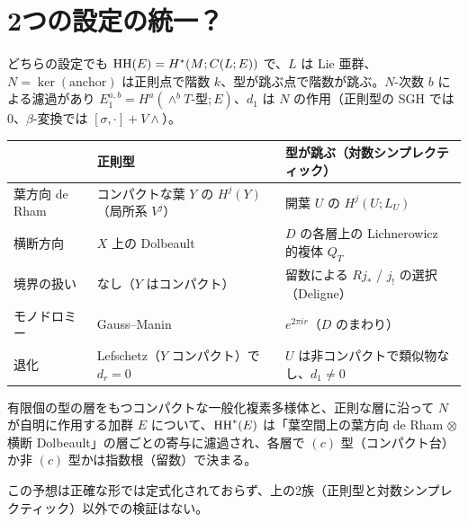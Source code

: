 \section{2つの設定の統一？}\label{sec:unified}
どちらの設定でも $\mathrm{HH}(E)=H^*(M;C(L;E))$ で、$L$ は Lie 亜群、$N=\ker(\text{anchor})$ は正則点で階数 $k$、型が跳ぶ点で階数が跳ぶ。$N$-次数 $b$ による濾過があり $E_1^{a,b}=H^a(\wedge^bT\text{-型};E)$、$d_1$ は $N$ の作用（正則型の SGH では 0、$\beta$-変換では $[\sigma,\cdot]+V\wedge$）。
\begin{center}\small
\begin{tabular}{p{3.2cm}p{5.4cm}p{5.4cm}}\toprule
 & 正則型 & 型が跳ぶ（対数シンプレクティック）\\\midrule
葉方向 de Rham & コンパクトな葉 $Y$ の $H^j(Y)$（局所系 $V^j$） & 開葉 $U$ の $H^j(U;L_U)$ \\\midrule
横断方向 & $X$ 上の Dolbeault & $D$ の各層上の Lichnerowicz 的複体 $Q_T$\\\midrule
境界の扱い & なし（$Y$ はコンパクト） & 留数による $Rj_*$ / $j_!$ の選択（Deligne）\\\midrule
モノドロミー & Gauss--Manin & $e^{2\pi ir}$（$D$ のまわり）\\\midrule
退化 & Lefschetz（$Y$ コンパクト）で $d_r=0$ & $U$ は非コンパクトで類似物なし、$d_1\neq0$\\\bottomrule
\end{tabular}
\end{center}
\begin{conj}\label{conj:U}
有限個の型の層をもつコンパクトな一般化複素多様体と、正則な層に沿って $N$ が自明に作用する加群 $E$ について、$\mathrm{HH}^*(E)$ は「葉空間上の葉方向 de Rham $\otimes$ 横断 Dolbeault」の層ごとの寄与に濾過され、各層で $(c)$ 型（コンパクト台）か非 $(c)$ 型かは指数根（留数）で決まる。
\end{conj}
\noindent この予想は正確な形では定式化されておらず、上の2族（正則型と対数シンプレクティック）以外での検証はない。

